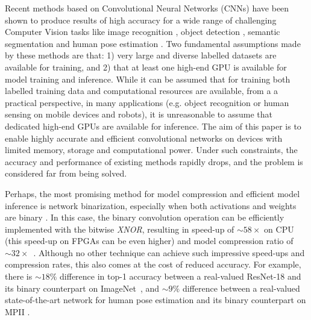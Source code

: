 \documentclass[10pt,twocolumn,letterpaper]{article}
\begin{document}
Recent methods based on Convolutional Neural Networks (CNNs)
have been shown to produce results of high accuracy for a wide range of challenging Computer Vision tasks like image recognition \cite{krizhevsky2012imagenet, simonyan2014very,he2016deep}, object detection \cite{ren2015faster}, semantic segmentation \cite{long2015fully, he2017mask} and human pose estimation \cite{xiao2018simple, newell2016stacked}. Two fundamental assumptions made by these methods are that: 1) very large and diverse labelled datasets are available for training, and 2) that at least one high-end GPU is available for model training and inference. While it can be assumed that for training both labelled training data and computational resources are available, from a a practical perspective, in many applications (e.g. object recognition or human sensing on mobile devices and robots), it is unreasonable to assume that dedicated high-end GPUs are available for inference. The aim of this paper is to enable highly accurate and efficient convolutional networks on devices with limited memory, storage and computational power. Under such constraints, the accuracy and performance of existing methods rapidly drops, and the problem is considered far from being solved.

Perhaps, the most promising method for model compression and efficient model inference is network binarization, especially when both activations and weights are binary  \cite{courbariaux2015binaryconnect, courbariaux2016binarized, rastegari2016xnor}. In this case, the binary convolution operation can be efficiently implemented with the bitwise \textit{XNOR}, resulting in speed-up of $\sim 58\times$ on CPU (this speed-up on FPGAs can be even higher) and model compression ratio of $\sim 32\times$~\cite{rastegari2016xnor}. Although no other technique can achieve such impressive speed-ups and compression rates, this also comes at the cost of reduced accuracy. For example, there is $ \sim 18 \%$ difference in top-1 accuracy between a real-valued ResNet-18 and its binary counterpart on ImageNet~\cite{rastegari2016xnor}, and $ \sim 9 \%$ difference between a real-valued state-of-the-art network for human pose estimation and its binary counterpart on MPII \cite{bulat2017binarized}.    
\end{document}
